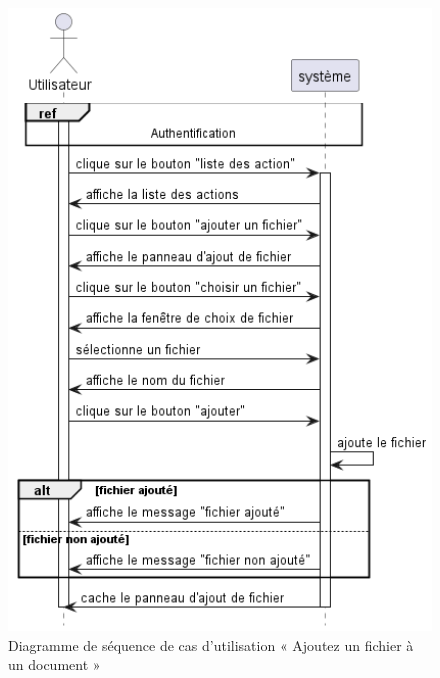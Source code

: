 \begin{figure}[H]
  \centering
  \includegraphics[width=1\textwidth]{out/diagrams/documents/add_file/add_file}
  \caption{Diagramme de séquence de cas d'utilisation « Ajoutez un fichier à un document  »}
  \label{fig:sequence_add_file}
\end{figure}
